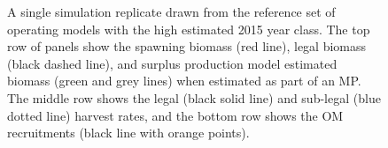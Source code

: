 \documentclass[11pt]{book}
\begin{document}
\newpage
\begin{landscape}
\begin{figure}[htb]

{\centering {} 

}

\caption{A single simulation replicate drawn from the reference set of operating models with the high estimated 2015 year class. The top row of panels show the spawning biomass (red line), legal biomass (black dashed line), and surplus production model estimated biomass (green and grey lines) when estimated as part of an MP. The middle row shows the legal (black solid line) and sub-legal (blue dotted line) harvest rates, and the bottom row shows the OM recruitments (black line with orange points).}\label{fig:unnamed-chunk-19}
\end{figure}
\newpage
\begin{figure}[htb]

{\centering {} 

}
\end{figure}
\end{landscape}
\end{document}
